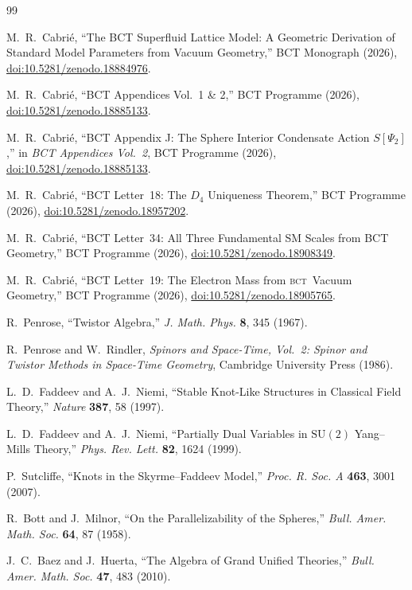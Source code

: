 \documentclass[aps,prl,preprint,superscriptaddress,floatfix]{revtex4-2}
\newcommand{\BCT}{\textsc{bct}}
\begin{document}
\begin{thebibliography}{99}

M.~R.~Cabri\'{e},
``The BCT Superfluid Lattice Model: A Geometric Derivation of Standard
Model Parameters from Vacuum Geometry,''
BCT Monograph (2026),
\href{https://doi.org/10.5281/zenodo.18884976}{doi:10.5281/zenodo.18884976}.

M.~R.~Cabri\'{e},
``BCT Appendices Vol.~1 \& 2,''
BCT Programme (2026),
\href{https://doi.org/10.5281/zenodo.18885133}{doi:10.5281/zenodo.18885133}.

M.~R.~Cabri\'{e},
``BCT Appendix J: The Sphere Interior Condensate Action $S[\Psi_2]$,''
in \textit{BCT Appendices Vol.~2}, BCT Programme (2026),
\href{https://doi.org/10.5281/zenodo.18885133}{doi:10.5281/zenodo.18885133}.

M.~R.~Cabri\'{e},
``BCT Letter~18: The $D_4$ Uniqueness Theorem,''
BCT Programme (2026),
\href{https://doi.org/10.5281/zenodo.18957202}{doi:10.5281/zenodo.18957202}.

M.~R.~Cabri\'{e},
``BCT Letter~34: All Three Fundamental SM Scales from BCT Geometry,''
BCT Programme (2026),
\href{https://doi.org/10.5281/zenodo.18908349}{doi:10.5281/zenodo.18908349}.

M.~R.~Cabri\'{e},
``BCT Letter~19: The Electron Mass from \BCT\ Vacuum Geometry,''
BCT Programme (2026),
\href{https://doi.org/10.5281/zenodo.18905765}{doi:10.5281/zenodo.18905765}.

R.~Penrose,
``Twistor Algebra,''
\textit{J. Math. Phys.} \textbf{8}, 345 (1967).

R.~Penrose and W.~Rindler,
\textit{Spinors and Space-Time, Vol.~2: Spinor and Twistor Methods in
Space-Time Geometry},
Cambridge University Press (1986).

L.~D.~Faddeev and A.~J.~Niemi,
``Stable Knot-Like Structures in Classical Field Theory,''
\textit{Nature} \textbf{387}, 58 (1997).

L.~D.~Faddeev and A.~J.~Niemi,
``Partially Dual Variables in $\mathrm{SU}(2)$ Yang--Mills Theory,''
\textit{Phys. Rev. Lett.} \textbf{82}, 1624 (1999).

P.~Sutcliffe,
``Knots in the Skyrme--Faddeev Model,''
\textit{Proc. R. Soc. A} \textbf{463}, 3001 (2007).

R.~Bott and J.~Milnor,
``On the Parallelizability of the Spheres,''
\textit{Bull. Amer. Math. Soc.} \textbf{64}, 87 (1958).

J.~C.~Baez and J.~Huerta,
``The Algebra of Grand Unified Theories,''
\textit{Bull. Amer. Math. Soc.} \textbf{47}, 483 (2010).

\end{thebibliography}
\end{document}
